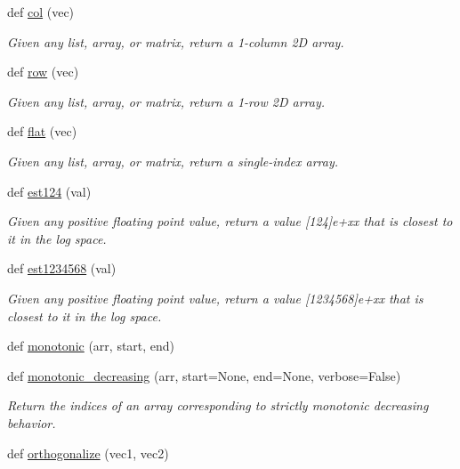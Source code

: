 \begin{DoxyCompactItemize}
def \hyperlink{namespacesrc_1_1nifty_a9548285fa85a369d98169ec25abe974c}{col} (vec)
\begin{DoxyCompactList}\small\item\em Given any list, array, or matrix, return a 1-\/column 2D array. \end{DoxyCompactList}\item 
def \hyperlink{namespacesrc_1_1nifty_a79d09a2aade73af50632d594f4826e11}{row} (vec)
\begin{DoxyCompactList}\small\item\em Given any list, array, or matrix, return a 1-\/row 2D array. \end{DoxyCompactList}\item 
def \hyperlink{namespacesrc_1_1nifty_ac5b7efc0b11b4fcbb7d0c37c97c4399d}{flat} (vec)
\begin{DoxyCompactList}\small\item\em Given any list, array, or matrix, return a single-\/index array. \end{DoxyCompactList}\item 
def \hyperlink{namespacesrc_1_1nifty_a75b4cb8a4924d753fb3df02f13b2d9ea}{est124} (val)
\begin{DoxyCompactList}\small\item\em Given any positive floating point value, return a value \mbox{[}124\mbox{]}e+xx that is closest to it in the log space. \end{DoxyCompactList}\item 
def \hyperlink{namespacesrc_1_1nifty_aa3ee0b694715bf7ef58a6c0b0e90bd86}{est1234568} (val)
\begin{DoxyCompactList}\small\item\em Given any positive floating point value, return a value \mbox{[}1234568\mbox{]}e+xx that is closest to it in the log space. \end{DoxyCompactList}\item 
def \hyperlink{namespacesrc_1_1nifty_a376cc4e72c89cfca911b308ca185cdbf}{monotonic} (arr, start, end)
\item 
def \hyperlink{namespacesrc_1_1nifty_a9e3f648d72235693254aa5cc5729441a}{monotonic\+\_\+decreasing} (arr, start=None, end=None, verbose=False)
\begin{DoxyCompactList}\small\item\em Return the indices of an array corresponding to strictly monotonic decreasing behavior. \end{DoxyCompactList}\item 
def \hyperlink{namespacesrc_1_1nifty_a2fb154ca0d5eff83ab20887cee6d9cef}{orthogonalize} (vec1, vec2)

\end{DoxyCompactItemize}

